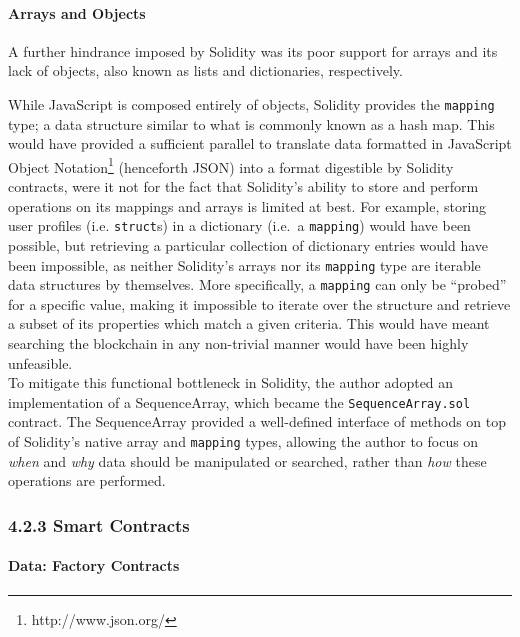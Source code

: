 \documentclass[12pt]{report}
\let\oldparagraph\paragraph
\renewcommand{\paragraph}[1]{\oldparagraph{#1}\mbox{}}
\begin{document}
\paragraph{Arrays and Objects}\label{arrays-and-objects}

A further hindrance imposed by Solidity was its poor support for arrays
and its lack of objects, also known as lists and dictionaries,
respectively.

While JavaScript is composed entirely of objects, Solidity provides the
\texttt{mapping} type; a data structure similar to what is commonly
known as a hash map. This would have provided a sufficient
parallel to translate data formatted in JavaScript Object
Notation\footnote{http://www.json.org/} (henceforth JSON) into a
format digestible by Solidity contracts, were it not for the fact that
Solidity's ability to store and perform operations on its mappings and
arrays is limited at best. For example, storing user profiles (i.e.
\texttt{struct}s) in a dictionary (i.e.~a \texttt{mapping}) would have
been possible, but retrieving a particular collection of dictionary
entries would have been impossible, as neither Solidity's arrays nor its
\texttt{mapping} type are iterable data structures by themselves. More
specifically, a \texttt{mapping} can only be ``probed'' for a specific
value, making it impossible to iterate over the structure and retrieve a
subset of its properties which match a given criteria. This would have
meant searching the blockchain in any non-trivial manner would have been
highly unfeasible.\\
To mitigate this functional bottleneck in Solidity, the author adopted
an implementation of a SequenceArray\cite{Shaffer2013}, which became the
\texttt{SequenceArray.sol} contract. The SequenceArray provided a
well-defined interface of methods on top of Solidity's native array and
\texttt{mapping} types, allowing the author to focus on \emph{when} and
\emph{why} data should be manipulated or searched, rather than
\emph{how} these operations are performed.

\subsubsection{4.2.3 Smart Contracts}\label{smart-contracts}

\paragraph{Data: Factory Contracts}\label{data-factory-contracts}
\end{document}
